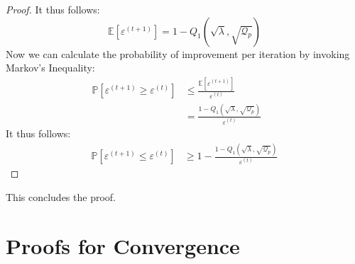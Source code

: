 \documentclass{article} %
\begin{document}
\begin{appendices}
\begin{proof}
		It thus follows:
		\begin{equation*}
			\mathbb{E}\left[\varepsilon^{(t+1)}\right] = 1 - Q_{1}\left(\sqrt{\lambda},\sqrt{\mathcal{Q}_p}\right)
		\end{equation*}
		Now we can calculate the probability of improvement per iteration by invoking Markov's Inequality:
		\begin{align*}
			\mathbb{P}\left[\varepsilon^{(t+1)} \geq \varepsilon^{(t)}\right] &\leq \frac{\mathbb{E}\left[\varepsilon^{(t+1)}\right]}{\varepsilon^{(t)}} &&\\
			&= \frac{1 - Q_{1}\left(\sqrt{\lambda},\sqrt{\mathcal{Q}_p}\right)}{\varepsilon^{(t)}}
		\end{align*}
		It thus follows:
		\begin{align*}
			\mathbb{P}\left[\varepsilon^{(t+1)} \leq \varepsilon^{(t)}\right] &\geq 1 - \frac{1 - Q_{1}\left(\sqrt{\lambda},\sqrt{\mathcal{Q}_p}\right)}{\varepsilon^{(t)}}
		\end{align*} 
	\end{proof}
	This concludes the proof.
	\newpage
	
	\section{Proofs for Convergence}
	\label{app:convergence-proofs}

\end{appendices}
\end{document}
